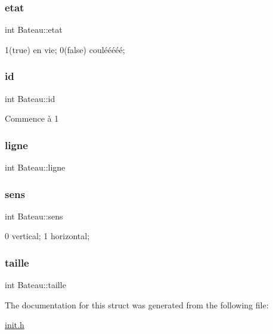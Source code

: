 \subsubsection{\texorpdfstring{etat}{etat}}
{\footnotesize\ttfamily int Bateau\+::etat}

1(true) en vie; 0(false) coulééééé; \hypertarget{structBateau_afc8b5863d722d86e00511dcae976220d}{}\label{structBateau_afc8b5863d722d86e00511dcae976220d} 
\subsubsection{\texorpdfstring{id}{id}}
{\footnotesize\ttfamily int Bateau\+::id}

Commence à 1 \hypertarget{structBateau_ae8d7a76573b9e27c1e72a15832b9d6f3}{}\label{structBateau_ae8d7a76573b9e27c1e72a15832b9d6f3} 
\subsubsection{\texorpdfstring{ligne}{ligne}}
{\footnotesize\ttfamily int Bateau\+::ligne}

\hypertarget{structBateau_a887a8ad2ee59ffd987eb5f9d117e83a2}{}\label{structBateau_a887a8ad2ee59ffd987eb5f9d117e83a2} 
\subsubsection{\texorpdfstring{sens}{sens}}
{\footnotesize\ttfamily int Bateau\+::sens}

0 vertical; 1 horizontal; \hypertarget{structBateau_a1dd818ea44eed67f756400eaac344a95}{}\label{structBateau_a1dd818ea44eed67f756400eaac344a95} 
\subsubsection{\texorpdfstring{taille}{taille}}
{\footnotesize\ttfamily int Bateau\+::taille}



The documentation for this struct was generated from the following file\+:\begin{DoxyCompactItemize}
\item 
\hyperlink{init_8h}{init.\+h}\end{DoxyCompactItemize}
